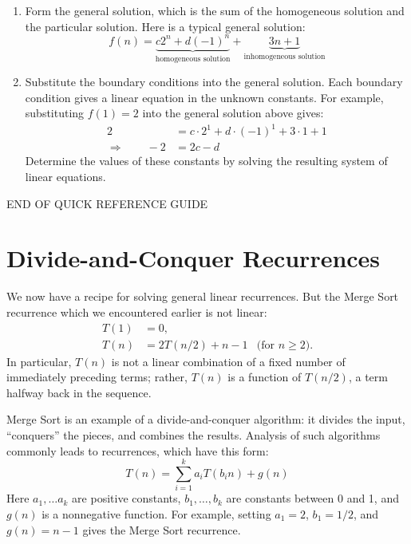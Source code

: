 \begin{enumerate}
\item Form the general solution, which is the sum of the homogeneous
  solution and the particular solution.  Here is a typical general
  solution:
\[
f(n) = \underbrace{c2^n + d(-1)^n}_{\text{homogeneous solution}} +
\underbrace{3n + 1}_{\text{inhomogeneous solution}}
\]
\item Substitute the boundary conditions into the general solution.
  Each boundary condition gives a linear equation in the unknown
  constants.  For example, substituting $f(1) = 2$ into the general
  solution above gives:
\begin{align*}
2 & = c\cdot2^1 + d \cdot(-1)^1 + 3 \cdot 1 + 1 \\
\Rightarrow \qquad -2 & = 2c - d
\end{align*}
Determine the values of these constants by solving the resulting
system of linear equations.
\end{enumerate}

\begin{center}
END OF QUICK REFERENCE GUIDE
\end{center}

\section{Divide-and-Conquer Recurrences}

We now have a recipe for solving general linear recurrences.  But the
Merge Sort recurrence which we encountered earlier is not linear:
\begin{align}
T(1) & = 0, \label{MS.1}\\
T(n) & = 2 T(n/2) + n - 1 & \text{(for $n \geq 2$)}.\label{MS.2}
\end{align}
In particular, $T(n)$ is not a linear combination of a fixed number of
immediately preceding terms; rather, $T(n)$ is a function of $T(n/2)$,
a term halfway back in the sequence.

Merge Sort is an example of a divide-and-conquer algorithm: it divides
the input, ``conquers'' the pieces, and combines the results.
Analysis of such algorithms commonly leads to 
recurrences, which have this form:
\begin{equation}\label{dandc_genl_eq}
T(n) =
 \sum_{i=1}^k a_i T(b_i n) + g(n)
\end{equation}
Here $a_1, \ldots a_k$ are positive constants, $b_1, \ldots, b_k$ are
constants between 0 and 1, and $g(n)$ is a nonnegative function.  For
example, setting $a_1 = 2$, $b_1 = 1/2$, and $g(n) = n - 1$ gives the
Merge Sort recurrence.

